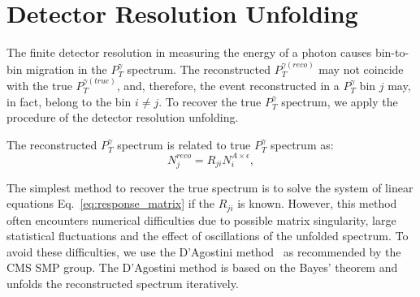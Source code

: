 \section{Detector Resolution Unfolding}
\label{sec:Unfolding}



The finite detector resolution in measuring the energy of a photon causes bin-to-bin migration in the $P_T^{\gamma}$ spectrum. The reconstructed $P_T^{\gamma(reco)}$ may not coincide with the true $P_T^{\gamma(true)}$, and, therefore, the event reconstructed in a $P_T^{\gamma}$ bin $j$ may, in fact, belong to the bin $i \neq j$. To recover the true $P_T^{\gamma}$ spectrum, we apply the procedure of the detector resolution unfolding.

The reconstructed $P_T^{\gamma}$ spectrum is related to true $P_T^{\gamma}$ spectrum as:
\begin{equation}\label{eq:response_matrix}
  N^{reco}_{j} = R_{ji} N^{A\times\epsilon}_{i},
\end{equation}

The simplest method to recover the true spectrum is to solve the system of linear equations Eq.~\ref{eq:response_matrix} if the $R_{ji}$ is known. However, this method often encounters numerical difficulties due to possible matrix singularity, large statistical fluctuations and the effect of oscillations of the unfolded spectrum. To avoid these difficulties, we use the D'Agostini method~\cite{ref_DAgostini} as recommended by the CMS SMP group. The D'Agostini method is based on the Bayes' theorem and unfolds the reconstructed spectrum iteratively.

